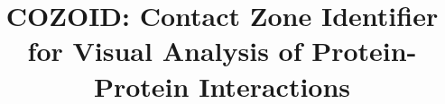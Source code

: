 \documentclass{bmcart}
\begin{document}
\begin{frontmatter}

\begin{fmbox}


\title{COZOID: Contact Zone Identifier for Visual Analysis of Protein-Protein Interactions}

\author[
   addressref={aff1},
   email={furmanova@mail.muni.cz}
]{ }
\author[
   addressref={aff2},     %
   email={jan.byska@gmail.com}   %
]{ }
\author[
   addressref={aff3},             %
   email={groeller@cg.tuwien.ac.at}   %
]{ }
\author[
   addressref={aff3},             %
   email={viola@cg.tuwien.ac.at}   %
]{ }
\author[
   addressref={aff1},             %
   email={jpalecek@sci.muni.cz}   %
]{ }
\author[
   addressref={aff1},             %
   email={kozlikova@fi.muni.cz}   %
]{ }



\end{fmbox}
\end{frontmatter}
\end{document}

